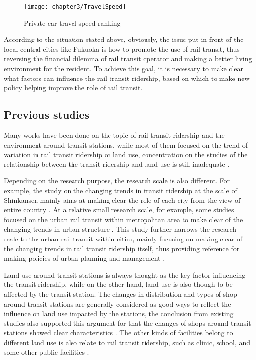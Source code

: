 %
\begin{figure}[htbp]
	\centering
	\texttt{[image: chapter3/TravelSpeed]}
	\caption{Private car travel speed ranking}
	\label{fig:chp3:TravelSpeed}
\end{figure}

%
According to the situation stated above, obviously, the issue put in front of the local central cities like Fukuoka is how to promote the use of rail transit, thus reversing the financial dilemma of rail transit operator and making a better living environment for the resident. To achieve this goal, it is necessary to make clear what factors can influence the rail transit ridership, based on which to make new policy helping improve the role of rail transit.

%
\subsection{Previous studies}
%
Many works have been done on the topic of rail transit ridership and the environment around transit stations, while most of them focused on the trend of variation in rail transit ridership or land use, concentration on the studies of the relationship between the transit ridership and land use is still inadequate \cite{matsumoto2013study,nakamura2015study}. 

%
Depending on the research purpose, the research scale is also different. For example, the study on the changing trends in transit ridership at the scale of Shinkansen mainly aims at making clear the role of each city from the view of entire country \cite{matsumoto2013study}. At a relative small research scale, for example, some studies focused on the urban rail transit within metropolitan area to make clear of the changing trends in urban structure \cite{song2013evaluation,baba2012change}. This study further narrows the research scale to the urban rail transit within cities, mainly focusing on making clear of the changing trends in rail transit ridership itself, thus providing reference for making policies of urban planning and management \cite{nakamura2015study,yano2008}. 

%
Land use around transit stations is always thought as the key factor influencing the transit ridership, while on the other hand, land use is also though to be affected by the transit station. The changes in distribution and types of shop around transit stations are generally considered as good ways to reflect the influence on land use impacted by the stations, the conclusion from existing studies also supported this argument for that the changes of shops around transit stations showed clear characteristics \cite{sui2013research,zhao2012study,kitayama2008study}. The other kinds of facilities belong to different land use is also relate to rail transit ridership, such as clinic, school, and some other public facilities \cite{lee1995predicting,lee1994temporal}. 

